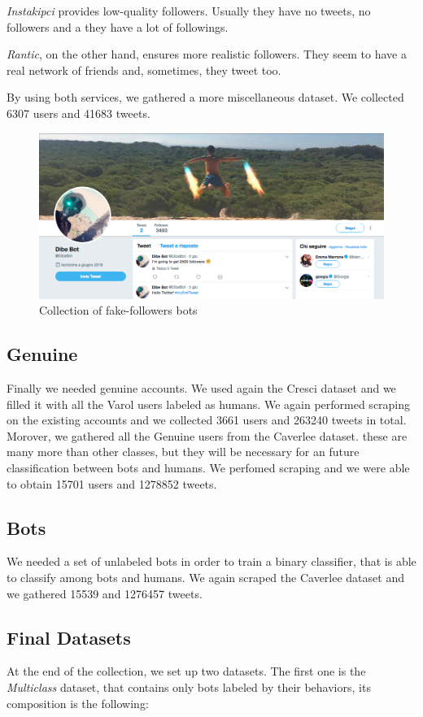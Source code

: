 \emph{Instakipci} provides low-quality followers. Usually they have no tweets, no followers and a they have a lot of followings.

\emph{Rantic}, on the other hand, ensures more realistic followers. They seem to have a real network of friends and, sometimes, they tweet too.

By using both services, we gathered a more miscellaneous dataset.
We collected 6307 users and 41683 tweets.
\begin{figure}
	\centering
	\includegraphics[width=\columnwidth]{chapter3/figure/dibebot.png}
	\caption{Collection of fake-followers bots}
	\label{fig:dibebot}
\end{figure}

\subsection{Genuine}
Finally we needed genuine accounts. We used again the Cresci dataset \cite{Cresci} and we filled it with all the Varol users labeled as humans. We again performed scraping on the existing accounts and we collected 3661 users and 263240 tweets in total.
Morover, we gathered all the Genuine users from the Caverlee dataset\cite{Lee11sevenmonths}. these are many more than other classes, but they will be necessary for an future classification between bots and humans. We perfomed scraping and we were able to obtain 15701 users and 1278852 tweets.

\subsection{Bots}
We needed a set of unlabeled bots in order to train a binary classifier, that is able to classify among bots and humans. We again scraped the Caverlee dataset \cite{Lee11sevenmonths} and we gathered 15539 and 1276457 tweets.

\subsection{Final Datasets}
At the end of the collection, we set up two datasets. The first one is the \textit{Multiclass} dataset, that contains only bots labeled by their behaviors, its composition is the following:

